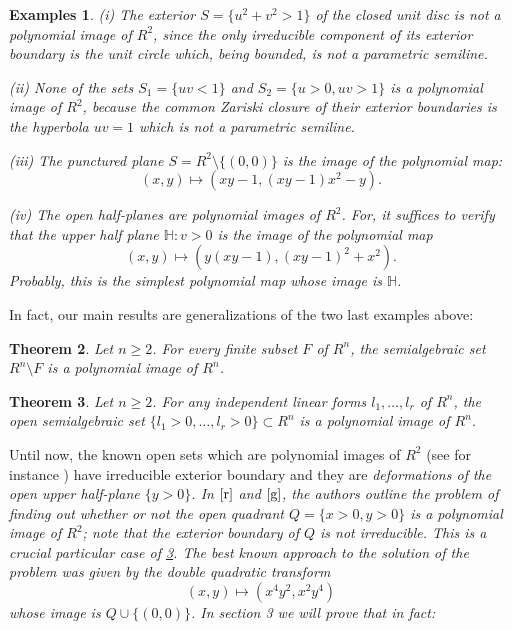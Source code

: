 \documentclass[11pt,draft]{article}
\newtheorem{thm}{Theorem}[section]
\newtheorem{sexamples}[thm]{Examples}
\newcommand{\HH}{{\mathbb H}} \newcommand{\BB}{{\mathbb B}}
\begin{document}
\begin{sexamples}\label{examples}
\em
\em (i) \em The exterior $S=\{u^2+v^2>1\}$ of the closed unit disc is not a polynomial
image of $R^2$, since the only irreducible component of its exterior boundary is the unit
circle which, being bounded, is not a parametric semiline.  

\em (ii) \em None of the sets $S_1=\{uv<1\}$ and $S_2=\{u>0,uv>1\}$ is a polynomial image
of $R^2$, because the common Zariski closure of their exterior boundaries is the hyperbola
$uv=1$ which is not a parametric semiline.

\em (iii) \em  The punctured plane $S=R^2\setminus\{(0,0)\}$ is the image of the polynomial
map:
$$(x,y)\mapsto (xy-1,(xy-1)x^2-y).$$

\em (iv) \em The open half-planes are polynomial images of $R^2$. For, it suffices to
verify that the upper half plane $\HH: v>0$ is the image of the polynomial map
$$
(x,y)\mapsto (y(xy-1),(xy-1)^2+x^2).
$$
Probably, this is the simplest polynomial map whose image is $\HH$.

\em
\end{sexamples}

In fact, our main results are generalizations of the two last examples above:

\begin{thm}\label{fp}
Let $n\geq 2$. For every finite subset $F$ of $R^n$, the semialgebraic set $R^n\setminus F$ is a 
polynomial image of $R^n$.
\end{thm}


\begin{thm}\label{main}
Let $n\geq 2$. For any independent linear forms $l_1,\ldots,l_r$ of $R^n$, the open semialgebraic set
$\{l_1>0,\ldots,l_r>0\}\subset R^n$ is a polynomial image of $R^n$.\end{thm}


Until now, the known open sets which are polynomial images of $R^2$ (see for instance
\cite{r}) have irreducible exterior boundary and they are \em deformations \em of the open
upper half-plane $\{y>0\}$. In $\cite{r}$ and $\cite{g}$, the authors outline the problem of
finding out whether or not the open quadrant  $Q=\{x>0,y>0\}$ is a polynomial image of
$R^2$; note that the exterior boundary of $Q$ is not irreducible. This is a crucial
particular case of
\ref{main}. The best known approach to the solution of the problem was given by the double
quadratic transform
$$(x,y)\mapsto (x^4 y^2,x^2 y^4)$$  
whose image is $Q\cup\{(0,0)\}$. In section 3 we will prove that in fact:
\end{document}
